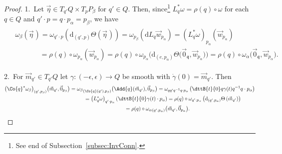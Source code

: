 \documentclass[pdftex]{sigma}
\numberwithin{equation}{section}
\begin{document}
\begin{proof}
1.~Let $\vec{\eta}\in T_{q'}Q\times T_pP_\beta$ for $q'\in Q$.
Then, since\footnote{See end of Subsection~\ref{subsec:InvConn}.} $L_q^{*}\omega = \rho(q)\circ \omega$ for each $q\in Q$
and $q'\cdot p= q\cdot p_\alpha =p_\beta$, we have
\begin{gather*}
\begin{split}
&\omega_\beta(\vec{\eta}\hspace{1pt})=\omega_{q'\cdot p}(\mathrm{d}_{(q', p)}\Theta (\vec{\eta}\hspace{1pt}))=\omega_{p_\beta}(\mathrm{d}
L_q\vec{w}_{p_\alpha}) =(L_q^{*}\omega)_{p_\alpha}(\vec{w}_{p_\alpha})
\\
&\phantom{\omega_\beta(\vec{\eta})}=\rho(q)\circ \omega_{p_\alpha}(\vec{w}_{p_\alpha})=\rho(q)\circ \omega_{p_\alpha}\big(\mathrm{d}_{(e,p_\alpha)}\Theta
\big(\vec{0}_\mathfrak{q},\vec{w}_{p_\alpha}\big)\big)
=\rho(q)\circ
\omega_{\alpha}\big(\vec{0}_\mathfrak{q},\vec{w}_{p_\alpha}\big).
\end{split}
\end{gather*}

2.~For $\vec{m}_{q'} \in T_{q'}Q$ let $\gamma \colon (-\epsilon,\epsilon)\rightarrow Q$ be smooth with
$\dot\gamma(0)=\vec{m}_{q'}$.
Then
\begin{gather*}
\big(\Co{q}^{*}\omega_\beta
\big)_{(q',p_\beta)}\big(\vec{m}_{q'},\vec{0}_{p_\beta}\big)
={\omega_\beta}_{(\Co{q}(q'),p_\beta)}\big(\Add{q}(\vec{m}_{q'}),\vec{0}_{p_\beta}\big)
=\omega_{qq'q^{-1}q\cdot p_\alpha }\left(\dttB{t}{0}q\gamma(t) q^{-1}q\cdot p_\alpha\right)
\\
\hphantom{\big(\Co{q}^{*}\omega_\beta
\big)_{(q',p_\beta)}\big(\vec{m}_{q'},\vec{0}_{p_\beta}\big)}{}
=\left(L_q^{*}\omega\right)_{q'\cdot p_\alpha }\left(\dttB{t}{0}\gamma(t)\cdot p_\alpha\right)
=\rho(q)\circ \omega_{q'\cdot p_\alpha}\left(\mathrm{d}_{(q',p_\alpha)}\Theta\left( \vec{m}_{q'}\right)\right)
\\
\hphantom{\big(\Co{q}^{*}\omega_\beta
\big)_{(q',p_\beta)}\big(\vec{m}_{q'},\vec{0}_{p_\beta}\big)}{}
=\rho(q)\circ {\omega_\alpha}_{(q',p_\alpha)} \big(\vec{m}_{q'},\vec{0}_{p_\alpha}\big).\tag*{\qed}
\end{gather*}
\renewcommand{\qed}{}
\end{proof}
\end{document}
